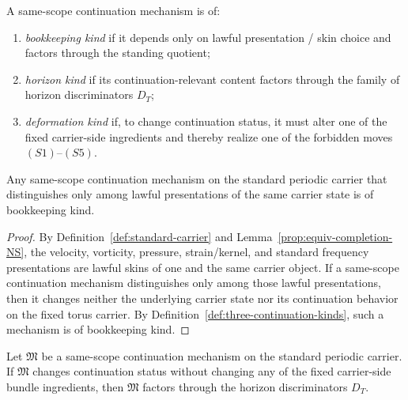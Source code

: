 \begin{manualdefinition}
\label{def:three-continuation-kinds}
A same-scope continuation mechanism is of:
\begin{enumerate}[label=(\roman*), leftmargin=2.2em]
\item \emph{bookkeeping kind} if it depends only on lawful presentation / skin choice and factors
through the standing quotient;
\item \emph{horizon kind} if its continuation-relevant content factors through the family of horizon
discriminators $D_T$;
\item \emph{deformation kind} if, to change continuation status, it must alter one of the fixed
carrier-side ingredients and thereby realize one of the forbidden moves $(S1)$--$(S5)$.
\end{enumerate}
\end{manualdefinition}

\begin{manualproposition}
\label{prop:lawful-skin-factorization}
Any same-scope continuation mechanism on the standard periodic carrier that distinguishes only among
lawful presentations of the same carrier state is of bookkeeping kind.
\end{manualproposition}

\begin{proof}
By Definition~\ref{def:standard-carrier} and Lemma~\ref{prop:equiv-completion-NS}, the velocity,
vorticity, pressure, strain/kernel, and standard frequency presentations are lawful skins of one and
the same carrier object. If a same-scope continuation mechanism distinguishes only among those lawful
presentations, then it changes neither the underlying carrier state nor its continuation behavior on
the fixed torus carrier. By Definition~\ref{def:three-continuation-kinds}, such a mechanism is of
bookkeeping kind.
\end{proof}

\begin{manualproposition}
\label{prop:horizon-factorization}
Let $\mathfrak M$ be a same-scope continuation mechanism on the standard periodic carrier.
If $\mathfrak M$ changes continuation status without changing any of the fixed carrier-side bundle
ingredients, then $\mathfrak M$ factors through the horizon discriminators $D_T$.
\end{manualproposition}

